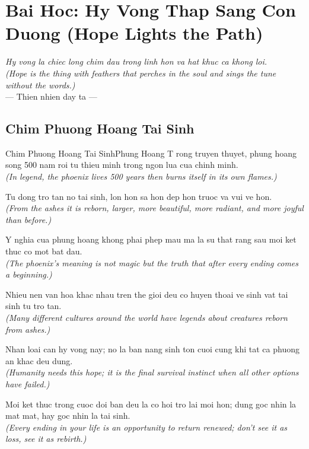 \chapter{Bai Hoc: Hy Vong Thap Sang Con Duong (Hope Lights the Path)}
\begin{center}
  \textit{\color{truyenblue}Hy vong la chiec long chim dau trong linh hon va hat khuc ca khong loi.}\\
  \textit{(Hope is the thing with feathers that perches in the soul and sings the tune without the words.)}\\[4pt]
  \small\color{truyengold}--- Thien nhien day ta ---
\end{center}
\ngancach

\section{Chim Phuong Hoang Tai Sinh}
\begin{truyen}{Chim Phuong Hoang Tai Sinh}{Phung Hoang}
T rong truyen thuyet, phung hoang song 500 nam roi tu thieu minh trong ngon lua cua chinh minh.\\
\textit{(In legend, the phoenix lives 500 years then burns itself in its own flames.)}

Tu dong tro tan no tai sinh, lon hon sa hon dep hon truoc va vui ve hon.\\
\textit{(From the ashes it is reborn, larger, more beautiful, more radiant, and more joyful than before.)}

Y nghia cua phung hoang khong phai phep mau ma la su that rang sau moi ket thuc co mot bat dau.\\
\textit{(The phoenix's meaning is not magic but the truth that after every ending comes a beginning.)}

Nhieu nen van hoa khac nhau tren the gioi deu co huyen thoai ve sinh vat tai sinh tu tro tan.\\
\textit{(Many different cultures around the world have legends about creatures reborn from ashes.)}

Nhan loai can hy vong nay; no la ban nang sinh ton cuoi cung khi tat ca phuong an khac deu dung.\\
\textit{(Humanity needs this hope; it is the final survival instinct when all other options have failed.)}

\end{truyen}
\begin{baihoc}
  Moi ket thuc trong cuoc doi ban deu la co hoi tro lai moi hon; dung goc nhin la mat mat, hay goc nhin la tai sinh.\\
  \textit{(Every ending in your life is an opportunity to return renewed; don't see it as loss, see it as rebirth.)}
\end{baihoc}

